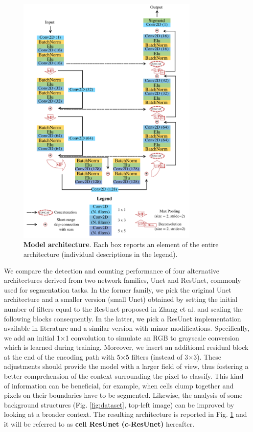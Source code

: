\begin{figure}
\centerline{
\includegraphics[width=0.8\textwidth]{figures/130_methods/c-resunet_architecture.pdf}
}
\caption{\textbf{Model architecture}. Each box reports an element of the entire architecture (individual descriptions in the legend). 
} \label{fig:model_architecture}
\end{figure}
We compare the detection and counting performance of four alternative architectures derived from two network families, Unet and ResUnet, commonly used for segmentation tasks.
In the former family, we pick the original Unet architecture \cite{unet} and a smaller version (small Unet) obtained by setting the initial number of filters equal to the ResUnet proposed in Zhang et al. \cite{deep_resunet} and scaling the following blocks consequently.
In the latter, we pick a ResUnet implementation available in literature \cite{deep_resunet} and a similar version with minor modifications.
Specifically, we add an initial 1$\times$1 convolution to simulate an RGB to grayscale conversion which is learned during training.
Moreover, we insert an additional residual block at the end of the encoding path with 5$\times$5 filters (instead of 3$\times$3). These adjustments should provide the model with a larger field of view, thus fostering a better comprehension of the context surrounding the pixel to classify.
This kind of information can be beneficial, for example, when cells clump together and pixels on their boundaries have to be segmented. 
Likewise, the analysis of some background structures (Fig. \ref{fig:dataset}, top-left image) can be improved by looking at a broader context.
The resulting architecture is reported in Fig. \ref{fig:model_architecture} and it will be referred to as \textbf{cell ResUnet (c-ResUnet)} hereafter.

